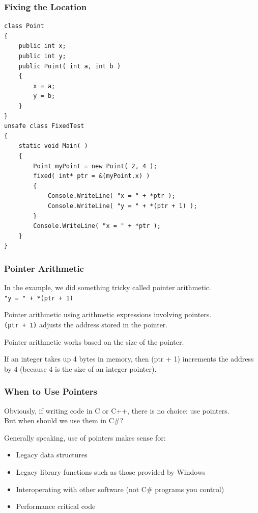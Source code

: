 \begin{frame}[fragile]
\frametitle{Fixing the Location}
{\scriptsize
\begin{verbatim}
class Point
{
    public int x;
    public int y;
    public Point( int a, int b )
    {
        x = a;
        y = b;
    }
}
unsafe class FixedTest
{
    static void Main( )
    {
        Point myPoint = new Point( 2, 4 );     
        fixed( int* ptr = &(myPoint.x) )
        {
            Console.WriteLine( "x = " + *ptr );
            Console.WriteLine( "y = " + *(ptr + 1) );
        }
        Console.WriteLine( "x = " + *ptr );
    }
}	
\end{verbatim}
}
\end{frame}

\begin{frame}
\frametitle{Pointer Arithmetic}

In the example, we did something tricky called \alert{pointer arithmetic}.\\
\quad \texttt{"y = " + *(ptr + 1)}

Pointer arithmetic using arithmetic expressions involving pointers.\\
\quad \texttt{(ptr + 1)} adjusts the address stored in the pointer.

Pointer arithmetic works based on the size of the pointer.

If an integer takes up 4 bytes in memory, then {(ptr + 1)} increments the address by 4 (because 4 is the size of an integer pointer).



\end{frame}


\begin{frame}
\frametitle{When to Use Pointers}
Obviously, if writing code in C or C++, there is no choice: use pointers.\\
\quad But when should we use them in C\#?

Generally speaking, use of pointers makes sense for:
\begin{itemize}
	\item Legacy data structures
	\item Legacy library functions such as those provided by Windows
	\item Interoperating with other software (not C\# programs you control)
	\item Performance critical code
\end{itemize}



\end{frame}







